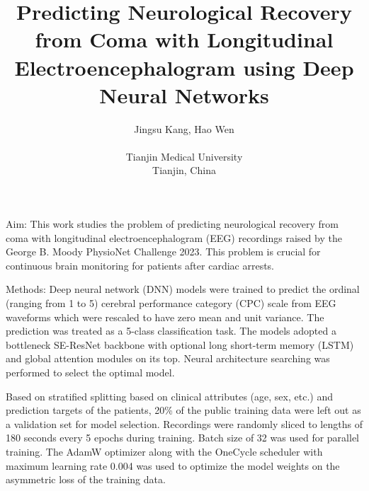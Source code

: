 \documentclass{cinc-abstract}
\begin{document}
\title{Predicting Neurological Recovery from Coma with Longitudinal Electroencephalogram using Deep Neural Networks}

\author {Jingsu Kang, Hao Wen\\ %
\ \\ %
Tianjin Medical University\\  %
Tianjin, China} %

\maketitle



Aim: This work studies the problem of predicting neurological recovery from coma with longitudinal electroencephalogram (EEG) recordings raised by the George B. Moody PhysioNet Challenge 2023. This problem is crucial for continuous brain monitoring for patients after cardiac arrests.

Methods: Deep neural network (DNN) models were trained to predict the ordinal (ranging from 1 to 5) cerebral performance category (CPC) scale from EEG waveforms which were rescaled to have zero mean and unit variance. The prediction was treated as a 5-class classification task. The models adopted a bottleneck SE-ResNet backbone with optional long short-term memory (LSTM) and global attention modules on its top. Neural architecture searching was performed to select the optimal model.

Based on stratified splitting based on clinical attributes (age, sex, etc.) and prediction targets of the patients, 20\% of the public training data were left out as a validation set for model selection. Recordings were randomly sliced to lengths of 180 seconds every 5 epochs during training. Batch size of 32 was used for parallel training. The AdamW optimizer along with the OneCycle scheduler with maximum learning rate 0.004 was used to optimize the model weights on the asymmetric loss of the training data.
\end{document}
